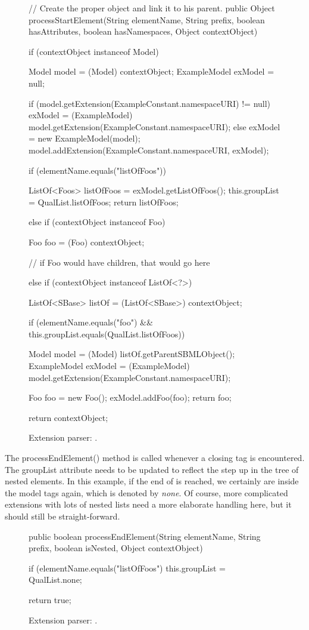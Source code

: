 \begin{figure}[htb]
  \begin{example}[numbers=left]
// Create the proper object and link it to his parent.
public Object processStartElement(String elementName, String prefix,
    boolean hasAttributes, boolean hasNamespaces, Object contextObject)
{

  if (contextObject instanceof Model) {
    Model model = (Model) contextObject;
    ExampleModel exModel = null;

    if (model.getExtension(ExampleConstant.namespaceURI) != null) {
      exModel = (ExampleModel) model.getExtension(ExampleConstant.namespaceURI);
    } else {
      exModel = new ExampleModel(model);
      model.addExtension(ExampleConstant.namespaceURI, exModel);
    }

    if (elementName.equals("listOfFoos")) {

      ListOf<Foos> listOfFoos = exModel.getListOfFoos();
      this.groupList = QualList.listOfFoos;
      return listOfFoos;
    }
  } else if (contextObject instanceof Foo) {
    Foo foo = (Foo) contextObject;

    // if Foo would have children, that would go here

  }
  else if (contextObject instanceof ListOf<?>)
  {
    ListOf<SBase> listOf = (ListOf<SBase>) contextObject;

    if (elementName.equals("foo") && this.groupList.equals(QualList.listOfFoos)) {
      Model model = (Model) listOf.getParentSBMLObject();
      ExampleModel exModel = (ExampleModel) model.getExtension(ExampleConstant.namespaceURI);

      Foo foo = new Foo();
      exModel.addFoo(foo);
      return foo;
    }
  }
  return contextObject;
}\end{example}
  \caption{Extension parser: .}
  \label{lst:ModelExtParserStartElement}
\end{figure}

The processEndElement() method is called whenever a closing tag is
encountered.  The groupList attribute needs to be updated to reflect the
step up in the tree of nested elements.  In this example, if the end of
 is reached, we certainly are inside the model tags
again, which is denoted by \emph{none}.  Of course, more complicated
extensions with lots of nested lists need a more elaborate handling here,
but it should still be straight-forward.

\begin{figure}[htb]
  \begin{example}[numbers=left]
public boolean processEndElement(String elementName, String prefix,
  boolean isNested, Object contextObject) {

  if (elementName.equals("listOfFoos")
  {
    this.groupList = QualList.none;
  }

  return true;
}\end{example}
  \caption{Extension parser: .}
  \label{lst:ModelExtParserEndElement}
\end{figure}

